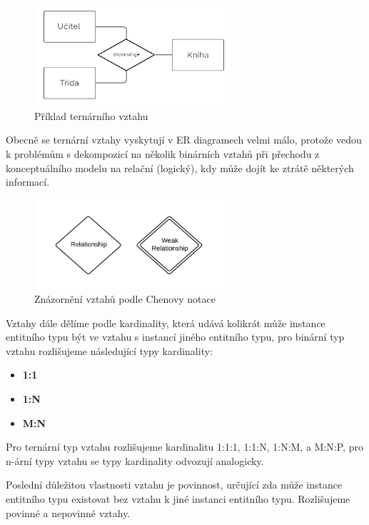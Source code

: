 \documentclass[czech,bachelor,public,dept460,male,oneside]{diploma}
\begin{document}
	\begin{figure}[!h]
		\centering
		\includegraphics[width=0.65\textwidth]{Figures/TernaryRelationship2}
		\caption{Příklad ternárního vztahu}
	\end{figure}

	Obecně se ternární vztahy vyskytují v ER diagramech velmi málo, protože vedou k problémům s dekompozicí na několik binárních vztahů při přechodu z konceptuálního modelu na relační (logický), kdy může dojít ke ztrátě některých informací.
	
	\begin{figure}[!h]
		\centering
		\includegraphics[width=0.65\textwidth]{Figures/ChenRelationships}
		\caption{Znázornění vztahů podle Chenovy notace}
	\end{figure}

	Vztahy dále dělíme podle kardinality, která udává kolikrát může instance entitního typu být ve vztahu s instancí jiného entitního typu, pro binární typ vztahu  rozlišujeme následující typy kardinality:
	
	\begin{itemize}
		\item \textbf{1:1}
		\item \textbf{1:N}
		\item \textbf{M:N}
	\end{itemize}

	Pro ternární typ vztahu rozlišujeme kardinalitu 1:1:1, 1:1:N, 1:N:M, a M:N:P, pro n-ární typy vztahu se typy kardinality odvozují analogicky.
	
	Poslední důležitou vlastnosti vztahu je povinnost, určující zda může instance entitního typu existovat bez vztahu k jiné instanci entitního typu. Rozlišujeme povinné a nepovinné vztahy.
	
\end{document}
